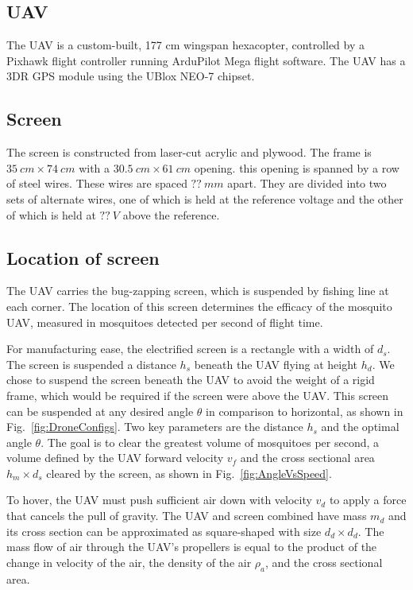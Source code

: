 \documentclass[letterpaper, 10 pt, conference]{ieeeconf}  %
\newcommand{\todo}[1]{\vspace{5 mm}\par \noindent \framebox{\begin{minipage}[c]{0.98 \columnwidth} \ttfamily\flushleft \textcolor{red}{#1}\end{minipage}}\vspace{5 mm}\par}
\begin{document}
  \subsection{UAV}
  
The UAV is a custom-built, 177 cm wingspan hexacopter, controlled by a Pixhawk flight controller running ArduPilot Mega flight software. The UAV has a 3DR GPS module using the UBlox NEO-7 chipset.

  \subsection{Screen}
  
  The screen is constructed from laser-cut acrylic and plywood.  The frame is $35~cm \times 74~cm$ with a   $30.5~cm \times 61~cm$  opening.  
  this opening is spanned by a row of steel wires.  These wires are spaced $??~mm$ apart.  They are divided into two sets of alternate wires, one of which is held at the reference voltage and the other of which is held at $??~V$ above the reference.

\todo{fill in missing values}

  \subsection{Location of screen}
 The UAV carries the bug-zapping screen, which is suspended by fishing line at each corner.  The location of this screen determines the efficacy of the mosquito UAV, measured in mosquitoes detected per second of flight time.

For manufacturing ease, the electrified screen is a rectangle with a width of $d_s$. The screen is suspended a distance $h_s$ beneath the UAV flying at height $h_d$.  We chose to suspend the screen beneath the UAV to avoid the weight of a rigid frame, which would be required if the screen were above the UAV.  This screen can be suspended at any desired angle $\theta$ in comparison to horizontal, as shown in Fig.~\ref{fig:DroneConfigs}.
Two key parameters are the distance $h_s$ and the optimal angle $\theta$.  The goal is to clear the greatest volume of mosquitoes per second, a volume defined by the UAV forward velocity $v_f$ and the cross sectional area $h_m \times d_s$ cleared by the screen, as shown in Fig.~\ref{fig:AngleVsSpeed}.

 To hover, the UAV must push sufficient air down with velocity $v_d$ to apply a force that cancels the pull of gravity.  The UAV and screen combined have mass $m_{d}$ and its cross section can be approximated as square-shaped with size $d_d \times d_d$.  The mass flow of air through the UAV's propellers is equal to the product of the change in velocity of the air, the density of the air $\rho_a$, and the cross sectional area.
 
\end{document}
